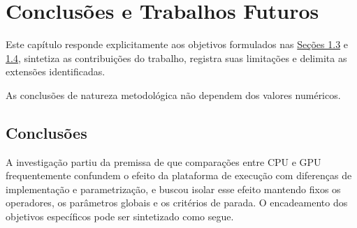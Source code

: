 \chapter{Conclusões e Trabalhos Futuros}\label{cap6-conclusoes}

Este capítulo responde explicitamente aos objetivos formulados nas \hyperref[sec-13-objetivo-geral]{Seções 1.3} e \hyperref[sec-14-objetivos-especificos]{1.4}, sintetiza as contribuições do trabalho, registra suas limitações e delimita as extensões identificadas.

\begin{warning}\label{obs-conclusoes-provisorias}
    As conclusões de natureza metodológica não dependem dos valores numéricos.
\end{warning}

\section{Conclusões}\label{sec-61-conclusoes}

A investigação partiu da premissa de que comparações entre CPU e GPU frequentemente confundem o efeito da plataforma de execução com diferenças de implementação e parametrização, e buscou isolar esse efeito mantendo fixos os operadores, os parâmetros globais e os critérios de parada.
O encadeamento dos objetivos específicos pode ser sintetizado como segue.

